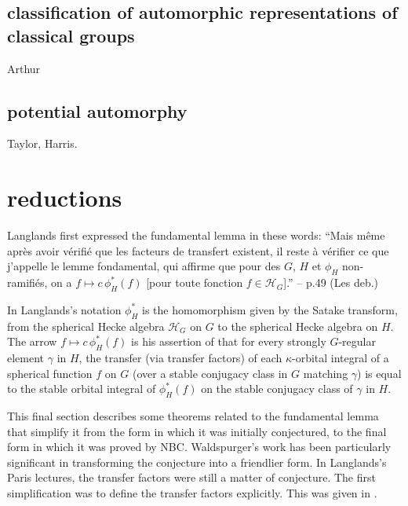 \documentclass[brochure,english,12pt]{bourbaki}
\begin{document}
\subsection{classification of automorphic representations of classical groups}

Arthur

\subsection{potential automorphy}

Taylor, Harris.






\section{reductions}

Langlands first expressed the fundamental lemma in these words:
``Mais m\^eme apr\`es avoir
v\'erifi\'e que les facteurs de
transfert existent, il reste \`a v\'erifier ce que j'appelle le
lemme fondamental, qui affirme que pour des $G$, $H$ et $\phi_H$
non-ramifi\'es, on a $f\mapsto c\, \phi_H^*(f)$ [pour toute fonction $f\in {\mathcal H}_G$].''
 -- p.49 (Les deb.)  \cite[p.49]{Debuts}

In Langlands's notation $\phi_H^*$ is the homomorphism given by the
Satake transform, from the spherical Hecke algebra ${\mathcal H}_G$ on
$G$ to the spherical Hecke algebra on $H$.  The arrow $f\mapsto
c\,\phi_H^*(f)$ is his assertion of that for every strongly $G$-regular element $\gamma$
in $H$, the transfer (via transfer factors) of each $\kappa$-orbital integral
of a spherical function $f$ on $G$ (over a stable conjugacy class in $G$ matching $\gamma$) is
equal to the stable orbital integral of $\phi_H^*(f)$ on the stable conjugacy class of $\gamma$ in $H$.

This final section describes some theorems related to the fundamental
lemma that simplify it from the form in which it was initially
conjectured, to the final form in which it was proved by NBC.
Waldspurger's work has been particularly significant in transforming the conjecture into a 
friendlier form.  In Langlands's
Paris lectures, the transfer factors were still a matter of conjecture.
The first simplification was to define the transfer factors explicitly.  
This was given in \cite{LS}.


\end{document}
